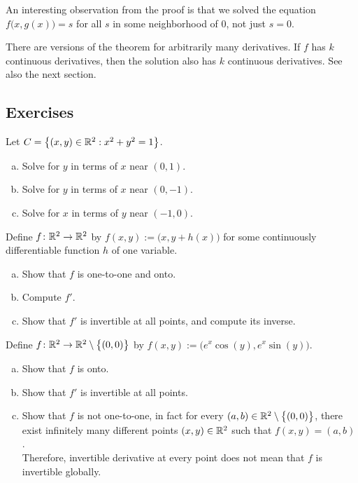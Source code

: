 An interesting observation from the proof is that we solved the equation
$f\bigl(x,g(x)\bigr) = s$ for all $s$ in some neighborhood of $0$, not just
$s=0$.

\begin{remark}
There are versions of the theorem for arbitrarily many derivatives.
If $f$ has $k$ continuous derivatives, then the solution also has $k$
continuous derivatives.  See also the next section.
\end{remark}


\subsection{Exercises}

\begin{exercise}
Let $C = \bigl\{ (x,y) \in {\mathbb{R}}^2 : x^2+y^2 = 1 \bigr\}$.
\begin{enumerate}[a)]
\item
Solve for $y$ in terms of $x$ near $(0,1)$.
\item
Solve for $y$ in terms of $x$ near $(0,-1)$.
\item
Solve for $x$ in terms of $y$ near $(-1,0)$.
\end{enumerate}
\end{exercise}

\begin{exercise}
Define $f \colon {\mathbb{R}}^2 \to {\mathbb{R}}^2$ by $f(x,y) :=
\bigl(x,y+h(x)\bigr)$ for some continuously differentiable function $h$ of one
variable.
\begin{enumerate}[a)]
\item
Show that $f$ is one-to-one and onto.
\item
Compute $f'$.
\item
Show that $f'$ is invertible at all points, and compute
its inverse.
\end{enumerate}
\end{exercise}

\begin{exercise}
Define $f \colon {\mathbb{R}}^2 \to {\mathbb{R}}^2 \setminus \bigl\{ (0,0) \bigr\}$ by $f(x,y) :=
\bigl(e^x\cos(y),e^x\sin(y)\bigr)$.
\begin{enumerate}[a)]
\item
Show that $f$ is onto.
\item
Show that $f'$ is invertible at all points.
\item
Show that $f$ is not one-to-one, in fact for every $(a,b) \in {\mathbb{R}}^2
\setminus \bigl\{ (0,0) \bigr\}$,
there exist infinitely many different points $(x,y) \in {\mathbb{R}}^2$ such that 
$f(x,y) = (a,b)$.\\
Therefore, invertible derivative at every point does not mean that
$f$ is invertible globally.
\end{enumerate}
\end{exercise}

